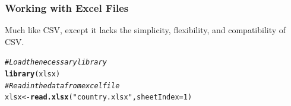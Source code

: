 \documentclass{beamer}\usepackage[]{graphicx}\usepackage[]{color}
\makeatletter
\newcommand{\hlnum}[1]{\textcolor[rgb]{0.686,0.059,0.569}{#1}}%
\newcommand{\hlstr}[1]{\textcolor[rgb]{0.192,0.494,0.8}{#1}}%
\newcommand{\hlcom}[1]{\textcolor[rgb]{0.678,0.584,0.686}{\textit{#1}}}%
\newcommand{\hlstd}[1]{\textcolor[rgb]{0.345,0.345,0.345}{#1}}%
\newcommand{\hlkwb}[1]{\textcolor[rgb]{0.69,0.353,0.396}{#1}}%
\newcommand{\hlkwc}[1]{\textcolor[rgb]{0.333,0.667,0.333}{#1}}%
\newcommand{\hlkwd}[1]{\textcolor[rgb]{0.737,0.353,0.396}{\textbf{#1}}}%
\newenvironment{kframe}{%
 \def\at@end@of@kframe{}%
 \ifinner\ifhmode%
  \def\at@end@of@kframe{\end{minipage}}%
  \begin{minipage}{\columnwidth}%
 \fi\fi%
 \def\FrameCommand##1{\hskip\@totalleftmargin \hskip-\fboxsep
 \colorbox{shadecolor}{##1}\hskip-\fboxsep
     \hskip-\linewidth \hskip-\@totalleftmargin \hskip\columnwidth}%
 \MakeFramed {\advance\hsize-\width
   \@totalleftmargin\z@ \linewidth\hsize
   \@setminipage}}%
 {\par\unskip\endMakeFramed%
 \at@end@of@kframe}
\newenvironment{knitrout}{}{} %
\makeatother
\begin{document}
\begin{frame}[fragile]
\frametitle{Working with Excel Files}

Much like CSV, except it lacks the simplicity, flexibility, and compatibility of CSV.

\begin{knitrout}\scriptsize
{}\color{fgcolor}\begin{kframe}
\begin{alltt}
\hlcom{# Load the necessary library}
\hlkwd{library}\hlstd{(xlsx)}
\hlcom{# Read in the data from excel file}
\hlstd{xlsx} \hlkwb{<-} \hlkwd{read.xlsx}\hlstd{(}\hlstr{"country.xlsx"}\hlstd{,} \hlkwc{sheetIndex} \hlstd{=} \hlnum{1}\hlstd{)}
\end{alltt}
\end{kframe}
\end{knitrout}

\end{frame}
\end{document}
